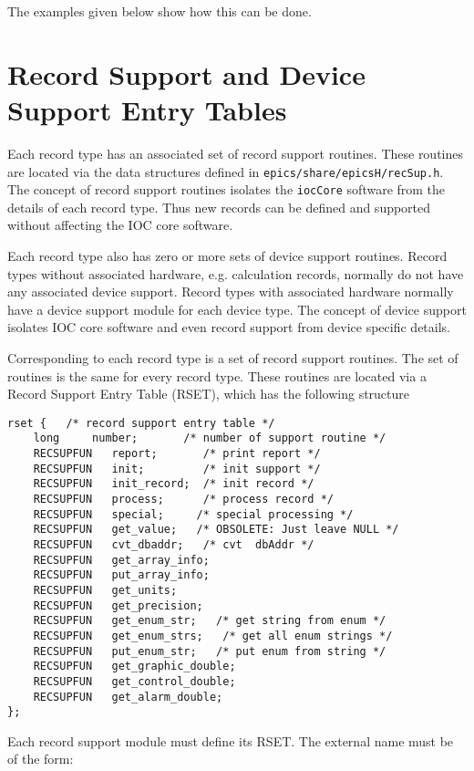 The examples given below show how this can be done.

\section{Record Support and Device Support Entry Tables}

Each record type has an associated set of record support routines. These routines are located via the data structures 
defined in \verb|epics/share/epicsH/recSup.h|. The concept of record support routines isolates the \verb|iocCore| software 
from the details of each record type. Thus new records can be defined and supported without affecting the IOC core 
software.

Each record type also has zero or more sets of device support routines. Record types without associated hardware, e.g. 
calculation records, normally do not have any associated device support. Record types with associated hardware normally 
have a  device support module for each device type. The concept of device support isolates IOC core software and even 
record support from device specific details.

Corresponding to each record type is a set of record support routines. The set of routines is the same for every record type. 
These routines are located via a Record Support Entry Table (RSET), which has the following structure

\begin{verbatim}
rset {   /* record support entry table */
    long     number;       /* number of support routine */
    RECSUPFUN   report;       /* print report */
    RECSUPFUN   init;         /* init support */
    RECSUPFUN   init_record;  /* init record */
    RECSUPFUN   process;      /* process record */
    RECSUPFUN   special;     /* special processing */
    RECSUPFUN   get_value;   /* OBSOLETE: Just leave NULL */
    RECSUPFUN   cvt_dbaddr;   /* cvt  dbAddr */
    RECSUPFUN   get_array_info;
    RECSUPFUN   put_array_info;
    RECSUPFUN   get_units;
    RECSUPFUN   get_precision;
    RECSUPFUN   get_enum_str;   /* get string from enum */
    RECSUPFUN   get_enum_strs;   /* get all enum strings */
    RECSUPFUN   put_enum_str;   /* put enum from string */
    RECSUPFUN   get_graphic_double;
    RECSUPFUN   get_control_double;
    RECSUPFUN   get_alarm_double;
};
\end{verbatim}

Each record support module must define its RSET. The external name must be of the form:

